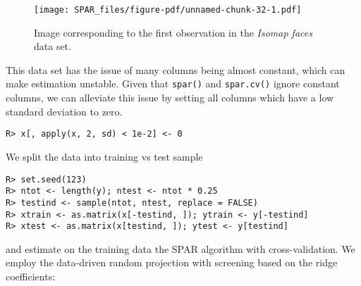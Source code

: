 \documentclass[
  article]{jss}
\begin{document}
\begin{figure}[H]

{\centering \texttt{[image: SPAR\_files/figure-pdf/unnamed-chunk-32-1.pdf]}

}

\caption{Image corresponding to the first observation in the
\emph{Isomap faces} data set. \label{fig:facesplot_i1}}

\end{figure}%

This data set has the issue of many columns being almost constant, which
can make estimation unstable. Given that \texttt{spar()} and
\texttt{spar.cv()} ignore constant columns, we can alleviate this issue
by setting all columns which have a low standard deviation to zero.

\begin{verbatim}
R> x[, apply(x, 2, sd) < 1e-2] <- 0
\end{verbatim}

We split the data into training vs test sample

\begin{verbatim}
R> set.seed(123)
R> ntot <- length(y); ntest <- ntot * 0.25
R> testind <- sample(ntot, ntest, replace = FALSE)
R> xtrain <- as.matrix(x[-testind, ]); ytrain <- y[-testind]
R> xtest <- as.matrix(x[testind, ]); ytest <- y[testind]
\end{verbatim}

and estimate on the training data the SPAR algorithm with
cross-validation. We employ the data-driven random projection with
screening based on the ridge coefficients:
\end{document}
